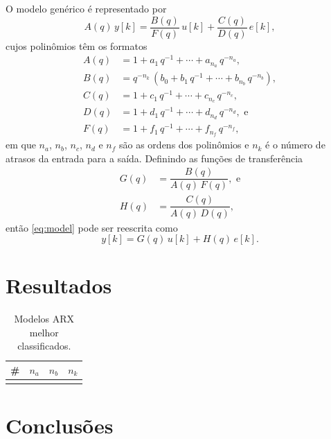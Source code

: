 \documentclass{ppgeesa}
\renewcommand{\Prod}{\,}
\begin{document}
O modelo genérico é representado por
\begin{equation}\label{eq:model}
  A(q) \Prod y[k] = \dfrac{B(q)}{F(q)} \Prod u[k] + \dfrac{C(q)}{D(q)} \Prod e[k]
  ,
\end{equation}
cujos polinômios têm os formatos
\begin{align}
  A(q) &= 1 + a_1 \Prod q^{-1} + \dotsb + a_{n_a} \Prod q^{-n_a}
  ,
  \\
  B(q) &= q^{-n_k} \Prod \left(b_0 + b_1 \Prod q^{-1} + \dotsb + b_{n_b} \Prod q^{-n_b}\right)
  ,
  \\
  C(q) &= 1 + c_1 \Prod q^{-1} + \dotsb + c_{n_c} \Prod q^{-n_c}
  ,
  \\
  D(q) &= 1 + d_1 \Prod q^{-1} + \dotsb + d_{n_d} \Prod q^{-n_d}
  , \text{ e}
  \\
  F(q) &= 1 + f_1 \Prod q^{-1} + \dotsb + f_{n_f} \Prod q^{-n_f}
  ,
\end{align}
em que $n_a$, $n_b$, $n_c$, $n_d$ e $n_f$ são as ordens dos polinômios e $n_k$ é o número de atrasos da entrada para a saída.
Definindo as funções de transferência
\begin{align}
  G(q) &= \dfrac{B(q)}{A(q) \Prod F(q)}
  , \text{ e}
  \\
  H(q) &= \dfrac{C(q)}{A(q) \Prod D(q)}
  ,
\end{align}
então \eqref{eq:model} pode ser reescrita como
\begin{equation}\label{eq:model-tf}
  y[k] = G(q) \Prod u[k] + H(q) \Prod e[k]
  .
\end{equation}

\section{Resultados}

\begin{table}[!htbp]
  \centering
  \caption{Modelos ARX melhor classificados.}
  \begin{tabular}{|c|c|c|c|}
    \hline
    \# & $n_a$ & $n_b$ & $n_k$ \\\hline\hline
    \\\hline
  \end{tabular}
  \label{tab:arx}
\end{table}
\section{Conclusões}

% 
% 
\end{document}
